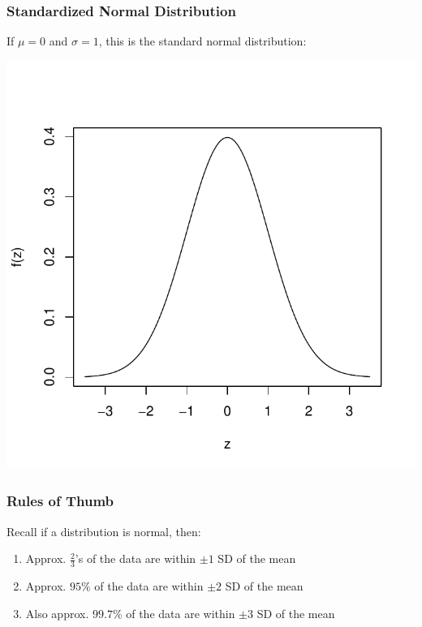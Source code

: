 \documentclass[handout]{beamer}
\newcommand{\blue}[1]{\textcolor{blue2}{#1}}
\begin{document}
\begin{frame}
\frametitle{Standardized Normal Distribution}
If $\mu=0$ and $\sigma=1$, this is the \blue{standard normal distribution}:
\begin{center}
\includegraphics{figure/standard_normal}
\end{center}
\end{frame}


\begin{frame}
\frametitle{Rules of Thumb}
Recall if a distribution is normal, then:  
\begin{enumerate}
\item Approx. $\frac{2}{3}$'s of the data are within $\pm 1$ SD of the mean
\item Approx. $95\%$ of the data are within $\pm 2$ SD of the mean
\pause\item Also approx. $99.7\%$ of the data are within $\pm 3$ SD of the mean
\end{enumerate}

\end{frame}
\end{document}
